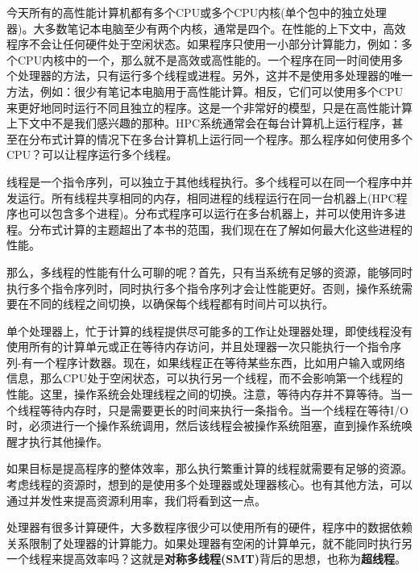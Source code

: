 
今天所有的高性能计算机都有多个CPU或多个CPU内核(单个包中的独立处理器)。大多数笔记本电脑至少有两个内核，通常是四个。在性能的上下文中，高效程序不会让任何硬件处于空闲状态。如果程序只使用一小部分计算能力，例如：多个CPU内核中的一个，那么就不是高效或高性能的。一个程序在同一时间使用多个处理器的方法，只有运行多个线程或进程。另外，这并不是使用多处理器的唯一方法，例如：很少有笔记本电脑用于高性能计算。相反，它们可以使用多个CPU来更好地同时运行不同且独立的程序。这是一个非常好的模型，只是在高性能计算上下文中不是我们感兴趣的那种。HPC系统通常会在每台计算机上运行程序，甚至在分布式计算的情况下在多台计算机上运行同一个程序。那么程序如何使用多个CPU？可以让程序运行多个线程。


线程是一个指令序列，可以独立于其他线程执行。多个线程可以在同一个程序中并发运行。所有线程共享相同的内存，相同进程的线程运行在同一台机器上(HPC程序也可以包含多个进程)。分布式程序可以运行在多台机器上，并可以使用许多进程。分布式计算的主题超出了本书的范围，我们现在在了解如何最大化这些进程的性能。

那么，多线程的性能有什么可聊的呢？首先，只有当系统有足够的资源，能够同时执行多个指令序列时，同时执行多个指令序列才会让性能更好。否则，操作系统需要在不同的线程之间切换，以确保每个线程都有时间片可以执行。

单个处理器上，忙于计算的线程提供尽可能多的工作让处理器处理，即使线程没有使用所有的计算单元或正在等待内存访问，并且处理器一次只能执行一个指令序列-有一个程序计数器。现在，如果线程正在等待某些东西，比如用户输入或网络信息，那么CPU处于空闲状态，可以执行另一个线程，而不会影响第一个线程的性能。这里，操作系统会处理线程之间的切换。注意，等待内存并不算等待。当一个线程等待内存时，只是需要更长的时间来执行一条指令。当一个线程在等待I/O时，必须进行一个操作系统调用，然后该线程会被操作系统阻塞，直到操作系统唤醒才执行其他操作。

如果目标是提高程序的整体效率，那么执行繁重计算的线程就需要有足够的资源。考虑线程的资源时，想到的是使用多个处理器或处理器核心。也有其他方法，可以通过并发性来提高资源利用率，我们将看到这一点。


处理器有很多计算硬件，大多数程序很少可以使用所有的硬件，程序中的数据依赖关系限制了处理器的计算能力。如果处理器有空闲的计算单元，就不能同时执行另一个线程来提高效率吗？这就是\textbf{对称多线程(SMT)}背后的思想，也称为\textbf{超线程}。

